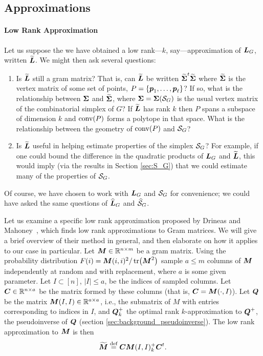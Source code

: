 \subsection{Approximations} 

\paragraph{Low Rank Approximation}

Let us suppose the we have obtained a low rank---$k$, say---approximation of $\vb*{L}_G$, written $\widetilde{\vb*{L}}$. We might then ask several questions: 
\begin{enumerate}
	\item Is $\widetilde{\vb*{L}}$ still a gram matrix? That is, can $\widetilde{\vb*{L}}$ be written $\widetilde{\boldsymbol{\Sigma}}^t\widetilde{\boldsymbol{\Sigma}}$ where $\widetilde{\boldsymbol{\Sigma}}$ is the vertex matrix of some set of points, $P=\{\vb*{p}_1,\dots,\vb*{p}_\ell\}$? If so, what is the relationship between $\boldsymbol{\Sigma}$ and $\widetilde{\boldsymbol{\Sigma}}$, where $\boldsymbol{\Sigma}=\boldsymbol{\Sigma}(\mathcal{S}_G)$ is the usual vertex matrix of the combinatorial simplex of $G$? If $\widetilde{\vb*{L}}$ has rank $k$ then $P$ spans a subspace of dimension $k$ and $\textnormal{conv}(P)$ forms a polytope in that space. What is the relationship between the geometry of $\textnormal{conv}(P)$ and $\mathcal{S}_G$?
	\item Is $\widetilde{\vb*{L}}$ useful in helping estimate properties of the simplex $\mathcal{S}_G$? For example, if one could bound the difference in the quadratic products of $\vb*{L}_G$ and $\widetilde{\vb*{L}}$, this would imply (via the results in Section \ref{sec:S_G}) that we could estimate many of the properties of $\mathcal{S}_G$. 
	\end{enumerate}

Of course, we have chosen to work with $\vb*{L}_G$ and $\mathcal{S}_G$ for convenience; we could have asked the same questions of $\widehat{\vb*{L}}_G$ and $\widehat{\mathcal{S}}_G$. 

Let us examine a specific low rank approximation proposed by Drineas and Mahoney~\cite{drineas2005approximating}, which finds low rank approximations to Gram matrices. We will give a brief overview of their method in general, and then elaborate on how it applies to our case in particular. Let ${\vb*{M}}\in\mathbb{R}^{n\times m}$ be a gram matrix. Using the probability distribution $F(i) = {\vb*{M}}(i,i)^2 / \tr({\vb*{M}}^2)$ sample $a\leq m$ columns of ${\vb*{M}}$ independently at random and with replacement, where $a$ is some given parameter. Let $I\subset[n]$, $|I|\leq a$, be the indices of sampled columns. Let $\vb*{C}\in\mathbb{R}^{n\times a}$ be the matrix formed by these columns (that is, $\vb*{C}={\vb*{M}}(\cdot,I)$).  Let $\vb*{Q}$ be the matrix ${\vb*{M}}(I,I)\in\mathbb{R}^{a\times a}$, i.e., the submatrix of $M$ with entries corresponding to indices in $I$, and $\vb*{Q}^+_k$  the optimal rank $k$-approximation to $\vb*{Q}^+$, the pseudoinverse of $\vb*{Q}$ (section \ref{sec:background_pseudoinverse}). The low rank approximation to ${\vb*{M}}$ is then 
\begin{equation*}
\widetilde{{\vb*{M}}} \overset{\text{def}}{=} \vb*{C}{\vb*{M}}(I,I)_k^+\vb*{C}^t.
\end{equation*}

